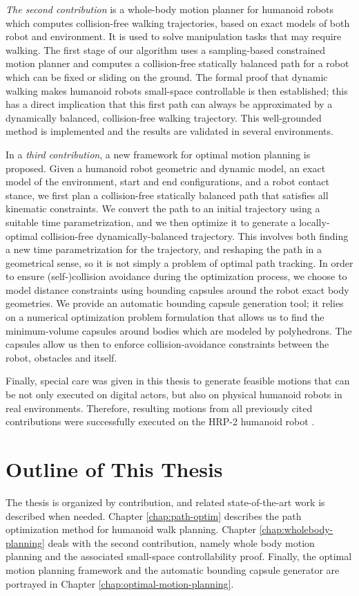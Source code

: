 \emph{The second contribution} is a whole-body motion planner for
humanoid robots which computes collision-free walking trajectories,
based on exact models of both robot and environment. It is used to
solve manipulation tasks that may require walking. The first stage of
our algorithm uses a sampling-based constrained motion planner and
computes a collision-free statically balanced path for a robot which
can be fixed or sliding on the ground. The formal proof that dynamic
walking makes humanoid robots small-space controllable is then
established; this has a direct implication that this first path can
always be approximated by a dynamically balanced, collision-free
walking trajectory. This well-grounded method is implemented and the
results are validated in several environments.

In a \emph{third contribution}, a new framework for optimal motion
planning is proposed. Given a humanoid robot geometric and dynamic
model, an exact model of the environment, start and end
configurations, and a robot contact stance, we first plan a
collision-free statically balanced path that satisfies all
kinematic constraints. We convert the path to an initial trajectory
using a suitable time parametrization, and we then optimize it
to generate a locally-optimal collision-free
dynamically-balanced trajectory. This involves both finding a
new time parametrization for the trajectory, and reshaping the path in
a geometrical sense, so it is not simply a problem of optimal path
tracking. In order to ensure (self-)collision avoidance during the
optimization process, we choose to model distance constraints using
bounding capsules around the robot exact body geometries. We provide
an automatic bounding capsule generation tool; it relies on a
numerical optimization problem formulation that allows us to find the
minimum-volume capsules around bodies which are modeled by
polyhedrons. The capsules allow us then to enforce collision-avoidance
constraints between the robot, obstacles and itself.

Finally, special care was given in this thesis to generate feasible
motions that can be not only executed on digital actors, but also on
physical humanoid robots in real environments. Therefore, resulting
motions from all previously cited contributions were successfully
executed on the HRP-2 humanoid robot \cite{kane04}.

\section{Outline of This Thesis}

The thesis is organized by contribution, and related state-of-the-art
work is described when needed. Chapter \ref{chap:path-optim} describes
the path optimization method for humanoid walk planning. Chapter
\ref{chap:wholebody-planning} deals with the second contribution,
namely whole body motion planning and the associated small-space
controllability proof. Finally, the optimal motion planning framework
and the automatic bounding capsule generator are portrayed in Chapter
\ref{chap:optimal-motion-planning}.
